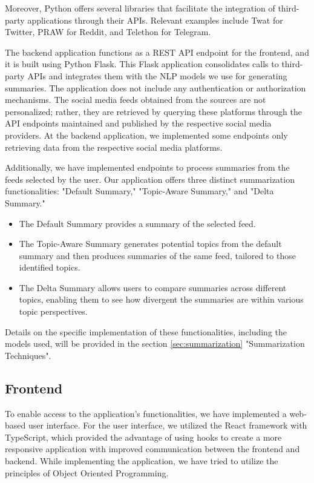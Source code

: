 Moreover, Python offers several libraries that facilitate the integration of third-party applications through their APIs. Relevant examples include Twat for Twitter, PRAW for Reddit, and Telethon for Telegram.

The backend application functions as a REST API endpoint for the frontend, and it is built using Python Flask. This Flask application consolidates calls to third-party APIs and integrates them with the NLP models we use for generating summaries. The application does not include any authentication or authorization mechanisms. The social media feeds obtained from the sources are not personalized; rather, they are retrieved by querying these platforms through the API endpoints maintained and published by the respective social media providers. At the backend application, we implemented some endpoints only retrieving data from the respective social media platforms.

Additionally, we have implemented endpoints to process summaries from the feeds selected by the user. Our application offers three distinct summarization functionalities: "Default Summary," "Topic-Aware Summary," and "Delta Summary."
\begin{itemize}
    \item The Default Summary provides a summary of the selected feed.
    \item The Topic-Aware Summary generates potential topics from the default summary and then produces summaries of the same feed, tailored to those identified topics.
    \item The Delta Summary allows users to compare summaries across different topics, enabling them to see how divergent the summaries are within various topic perspectives.
\end{itemize}

Details on the specific implementation of these functionalities, including the models used, will be provided in the section \ref{sec:summarization} "Summarization Techniques".

\subsection{Frontend}
To enable access to the application's functionalities, we have implemented a web-based user interface. For the user interface, we utilized the React framework with TypeScript, which provided the advantage of using hooks to create a more responsive application with improved communication between the frontend and backend. While implementing the application, we have tried to utilize the principles of Object Oriented Programming.

